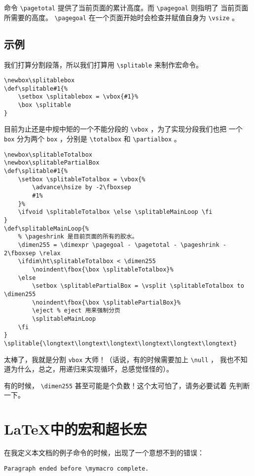 命令 \verb|\pagetotal| 提供了当前页面的累计高度。而 \verb|\pagegoal| 则指明了
当前页面所需要的高度。 \verb|\pagegoal| 在一个页面开始时会检查并赋值自身为%
 \verb|\vsize| 。

\subsection{示例}

我们打算分割段落，所以我们打算用 \verb|\splitable| 来制作宏命令。
\begin{lstlisting}
\newbox\splitablebox
\def\splitable#1{%
    \setbox \splitablebox = \vbox{#1}%
    \box \splitable
}
\end{lstlisting}

目前为止还是中规中矩的一个不能分段的 \verb|\vbox| ，为了实现分段我们也把
一个 \verb|box| 分为两个 \verb|box| ，分别是 \verb|\totalbox| 和 \verb|\partialbox| %
。
\begin{lstlisting}
\newbox\splitableTotalbox
\newbox\splitablePartialBox
\def\splitable#1{%
    \setbox \splitableTotalbox = \vbox{%
        \advance\hsize by -2\fboxsep
        #1%
    }%
    \ifvoid \splitableTotalbox \else \splitableMainLoop \fi
}
\def\splitableMainLoop{%
    % \pageshrink 是目前页面的所有的胶水。
    \dimen255 = \dimexpr \pagegoal - \pagetotal - \pageshrink - 2\fboxsep \relax
    \ifdim\ht\splitableTotalbox < \dimen255
        \noindent\fbox{\box \splitableTotalbox}%
    \else
        \setbox \splitablePartialBox = \vsplit \splitableTotalbox to \dimen255
        \noindent\fbox{\box \splitablePartialBox}%
        \eject % eject 用来强制分页
        \splitableMainLoop
    \fi
}
\splitable{\longtext\longtext\longtext\longtext\longtext\longtext}
\end{lstlisting}

太棒了，我就是分割 \verb|vbox| 大师！（话说，有的时候需要加上 \verb|\null| ，
我也不知道为什么，总之，用递归来实现循环，总感觉怪怪的）。

有的时候， \verb|\dimen255| 甚至可能是个负数！这个太可怕了，请务必要试着
先判断一下。


\section{\LaTeX{}中的宏和超长宏}

在我定义本文档的例子命令的时候，出现了一个意想不到的错误：
\begin{lstlisting}
Paragraph ended before \mymacro complete.
\end{lstlisting}

